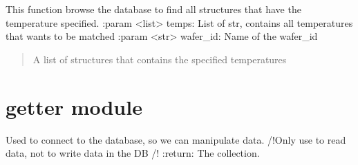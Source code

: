 \documentclass[letterpaper,10pt,english]{sphinxmanual}
\begin{document}

\begin{fulllineitems}
\label{\detokenize{filter:filter.filter_by_temp}}
\pysigstartsignatures
{}
\pysigstopsignatures
\sphinxAtStartPar
This function browse the database to find all structures that have the temperature specified.
:param \textless{}list\textgreater{} temps: List of str, contains all temperatures that wants to be matched
:param \textless{}str\textgreater{} wafer\_id: Name of the wafer\_id
\begin{quote}\begin{description}
\sphinxAtStartPar
A list of structures that contains the specified temperatures

\end{description}\end{quote}

\end{fulllineitems}


\sphinxstepscope


\chapter{getter module}
\label{\detokenize{getter:module-getter}}\label{\detokenize{getter:getter-module}}\label{\detokenize{getter::doc}}

\begin{fulllineitems}
\label{\detokenize{getter:getter.connexion}}
\pysigstartsignatures
{}
\pysigstopsignatures
\sphinxAtStartPar
Used to connect to the database, so we can manipulate data. /!Only use to read data, not to write data in the DB /!    :return: The collection.

\end{fulllineitems}

\end{document}
